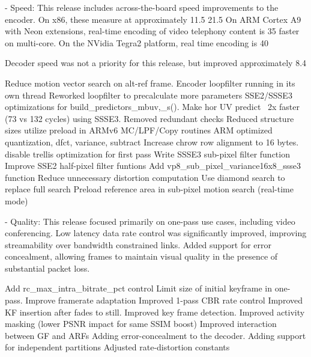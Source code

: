 \begin{DoxyVerbInclude}
  - Speed:
      This release includes across-the-board speed improvements to the
      encoder. On x86, these measure at approximately 11.5%
      21.5%
      On ARM Cortex A9 with Neon extensions, real-time encoding of video
      telephony content is 35%
      faster on multi-core. On the NVidia Tegra2 platform, real time
      encoding is 40%

      Decoder speed was not a priority for this release, but improved
      approximately 8.4%

          Reduce motion vector search on alt-ref frame.
          Encoder loopfilter running in its own thread
          Reworked loopfilter to precalculate more parameters
          SSE2/SSSE3 optimizations for build_predictors_mbuv{,_s}().
          Make hor UV predict ~2x faster (73 vs 132 cycles) using SSSE3.
          Removed redundant checks
          Reduced structure sizes
          utilize preload in ARMv6 MC/LPF/Copy routines
          ARM optimized quantization, dfct, variance, subtract
          Increase chrow row alignment to 16 bytes.
          disable trellis optimization for first pass
          Write SSSE3 sub-pixel filter function
          Improve SSE2 half-pixel filter funtions
          Add vp8_sub_pixel_variance16x8_ssse3 function
          Reduce unnecessary distortion computation
          Use diamond search to replace full search
          Preload reference area in sub-pixel motion search (real-time mode)

  - Quality:
      This release focused primarily on one-pass use cases, including
      video conferencing. Low latency data rate control was significantly
      improved, improving streamability over bandwidth constrained links.
      Added support for error concealment, allowing frames to maintain
      visual quality in the presence of substantial packet loss.

          Add rc_max_intra_bitrate_pct control
          Limit size of initial keyframe in one-pass.
          Improve framerate adaptation
          Improved 1-pass CBR rate control
          Improved KF insertion after fades to still.
          Improved key frame detection.
          Improved activity masking (lower PSNR impact for same SSIM boost)
          Improved interaction between GF and ARFs
          Adding error-concealment to the decoder.
          Adding support for independent partitions
          Adjusted rate-distortion constants



\end{DoxyVerbInclude}
